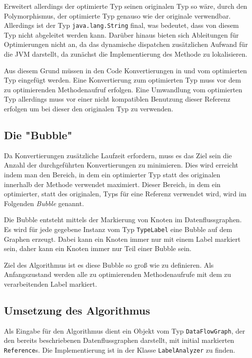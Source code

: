Erweitert allerdings der optimierte Typ seinen originalen Typ so wäre, durch den 
Polymorphismus, der optimierte Typ genauso wie der originale verwendbar. Allerdings 
ist der Typ \texttt{java.lang.String} final, was bedeutet, dass von diesem Typ nicht 
abgeleitet werden kann. Darüber hinaus bieten sich Ableitungen für Optimierungen nicht
an, da das dynamische dispatchen zusätzlichen Aufwand für die JVM darstellt, da 
zunächst die Implementierung des Methode zu lokalisieren.

Aus diesem Grund müssen in den Code Konvertierungen in und vom optimierten Typ 
eingefügt werden. Eine Konvertierung zum optimierten Typ muss vor dem zu optimierenden
Methodenaufruf erfolgen. Eine Umwandlung vom optimierten Typ allerdings muss vor einer 
nicht kompatiblen Benutzung dieser Referenz erfolgen um bei dieser den originalen Typ 
zu verwenden.

\subsection{Die "Bubble"}

Da Konvertierungen zusätzliche Laufzeit erfordern, muss es das Ziel sein die Anzahl 
der durchgeführten Konvertierungen zu minimieren. Dies wird erreicht indem man den
Bereich, in dem ein optimierter Typ statt des originalen innerhalb der Methode 
verwendet maximiert. Dieser Bereich, in dem ein optimierter, statt des originalen, 
Typs für eine Referenz verwendet wird, wird im Folgenden \textit{Bubble} genannt. 

Die Bubble entsteht mittels der Markierung von Knoten im Datenflussgraphen. Es wird 
für jede gegebene Instanz vom Typ \texttt{TypeLabel} eine Bubble auf dem Graphen 
erzeugt. Dabei kann ein Knoten immer nur mit einem Label markiert sein, daher kann
ein Knoten immer nur Teil einer Bubble sein.

Ziel des Algorithmus ist es diese Bubble so groß wie zu definieren. Als Anfangszustand 
werden alle zu optimierenden Methodenaufrufe mit dem zu verarbeitenden Label markiert.

\subsection{Umsetzung des Algorithmus}

Als Eingabe für den Algorithmus dient ein Objekt vom Typ \texttt{DataFlowGraph}, der 
den bereits beschriebenen Datenflussgraphen darstellt, mit initial markierten
\texttt{Reference}s. Die Implementierung ist in der Klasse \texttt{LabelAnalyzer}
zu finden. 

